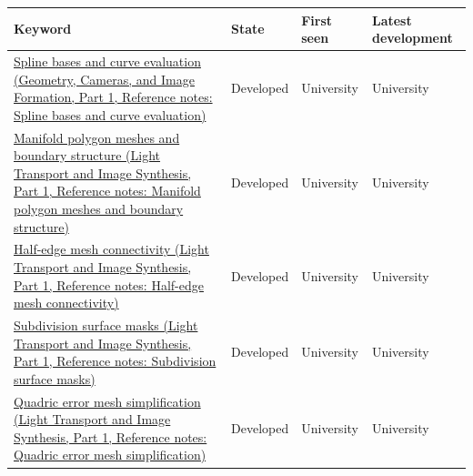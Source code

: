 {\def\LTcaptype{none} %
\begin{longtable}[]{@{}
  >{\raggedright\arraybackslash}p{}
  >{\raggedright\arraybackslash}p{}
  >{\raggedright\arraybackslash}p{}
  >{\raggedright\arraybackslash}p{}@{}}
\toprule\noalign{}
\begin{minipage}[b]{\linewidth}\raggedright
Keyword
\end{minipage} & \begin{minipage}[b]{\linewidth}\raggedright
State
\end{minipage} & \begin{minipage}[b]{\linewidth}\raggedright
First seen
\end{minipage} & \begin{minipage}[b]{\linewidth}\raggedright
Latest development
\end{minipage} \\
\midrule\noalign{}
\endhead
\bottomrule\noalign{}
\endlastfoot
\href{../03-Geometry-Cameras-and-Image-Formation-P01/main.pdf\#nameddest=appendix-f28eeec97a3d}{Spline bases and curve evaluation (Geometry, Cameras, and Image Formation, Part 1, Reference notes: Spline bases and curve evaluation)} & Developed & University & University \\
\href{../04-Light-Transport-and-Image-Synthesis-P01/main.pdf\#nameddest=appendix-fab348609369}{Manifold polygon meshes and boundary structure (Light Transport and Image Synthesis, Part 1, Reference notes: Manifold polygon meshes and boundary structure)} & Developed & University & University \\
\href{../04-Light-Transport-and-Image-Synthesis-P01/main.pdf\#nameddest=appendix-1aea26b2307f}{Half-edge mesh connectivity (Light Transport and Image Synthesis, Part 1, Reference notes: Half-edge mesh connectivity)} & Developed & University & University \\
\href{../04-Light-Transport-and-Image-Synthesis-P01/main.pdf\#nameddest=appendix-0234ab7f86b1}{Subdivision surface masks (Light Transport and Image Synthesis, Part 1, Reference notes: Subdivision surface masks)} & Developed & University & University \\
\href{../04-Light-Transport-and-Image-Synthesis-P01/main.pdf\#nameddest=appendix-1dd4ad54ca57}{Quadric error mesh simplification (Light Transport and Image Synthesis, Part 1, Reference notes: Quadric error mesh simplification)} & Developed & University & University \\

\end{longtable}}
